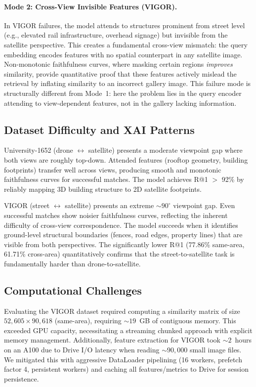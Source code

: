 \documentclass{article}
\begin{document}
\paragraph{Mode 2: Cross-View Invisible Features (VIGOR).}
In VIGOR failures, the model attends to structures prominent from street level (e.g., elevated rail infrastructure, overhead signage) but invisible from the satellite perspective.
This creates a fundamental cross-view mismatch: the query embedding encodes features with no spatial counterpart in any satellite image.
Non-monotonic faithfulness curves, where masking certain regions \emph{improves} similarity, provide quantitative proof that these features actively mislead the retrieval by inflating similarity to an incorrect gallery image.
This failure mode is structurally different from Mode~1: here the problem lies in the query encoder attending to view-dependent features, not in the gallery lacking information.

\subsection{Dataset Difficulty and XAI Patterns}

University-1652 (drone $\leftrightarrow$ satellite) presents a moderate viewpoint gap where both views are roughly top-down.
Attended features (rooftop geometry, building footprints) transfer well across views, producing smooth and monotonic faithfulness curves for successful matches.
The model achieves R@1 $>$ 92\% by reliably mapping 3D building structure to 2D satellite footprints.

VIGOR (street $\leftrightarrow$ satellite) presents an extreme ${\sim}90^\circ$ viewpoint gap.
Even successful matches show noisier faithfulness curves, reflecting the inherent difficulty of cross-view correspondence.
The model succeeds when it identifies ground-level structural boundaries (fences, road edges, property lines) that are visible from both perspectives.
The significantly lower R@1 (77.86\% same-area, 61.71\% cross-area) quantitatively confirms that the street-to-satellite task is fundamentally harder than drone-to-satellite.

\subsection{Computational Challenges}

Evaluating the VIGOR dataset required computing a similarity matrix of size $52{,}605 \times 90{,}618$ (same-area), requiring ${\sim}19$~GB of contiguous memory.
This exceeded GPU capacity, necessitating a streaming chunked approach with explicit memory management.
Additionally, feature extraction for VIGOR took ${\sim}2$~hours on an A100 due to Drive I/O latency when reading ${\sim}90{,}000$ small image files.
We mitigated this with aggressive DataLoader pipelining (16 workers, prefetch factor 4, persistent workers) and caching all features/metrics to Drive for session persistence.
\end{document}
